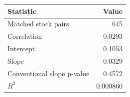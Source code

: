 \begin{tabular}{lr}
\toprule
Statistic & Value \\
\midrule
Matched stock pairs & 645 \\
Correlation & 0.0293 \\
Intercept & 0.1053 \\
Slope & 0.0329 \\
Conventional slope p-value & 0.4572 \\
$R^2$ & 0.000860 \\
\bottomrule
\end{tabular}
